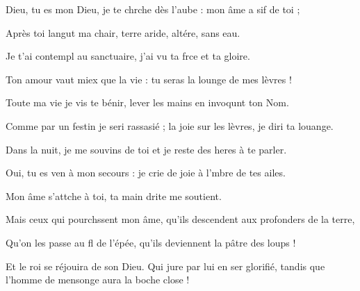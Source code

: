 \item Dieu, tu es mon Dieu, je te chrche dès l’aube :\psstar{} mon âme a sif de toi ;
\item Après toi langut ma chair,\psstar{} terre aride, altére, sans eau.
\item Je t’ai contempl au sanctuaire,\psstar{} j’ai vu ta frce et ta gloire.
\item Ton amour vaut miex que la vie :\psstar{} tu seras la lounge de mes lèvres !
\item Toute ma vie je vis te bénir,\psstar{} lever les mains en invoqunt ton Nom.
\item Comme par un festin je seri rassasié ;\psstar{} la joie sur les lèvres, je diri ta louange.
\item Dans la nuit, je me souvins de toi\psstar{} et je reste des heres à te parler.
\item Oui, tu es ven à mon secours :\psstar{} je crie de joie à l’mbre de tes ailes.
\item Mon âme s’attche à toi,\psstar{} ta main drite me soutient.
\item Mais ceux qui pourchssent mon âme,\psstar{} qu’ils descendent aux profonders de la terre,
\item Qu’on les passe au fl de l’épée,\psstar{} qu’ils deviennent la pâtre des loups !
\item Et le roi se réjouira de son Dieu.\pscross{} Qui jure par lui en ser glorifié,\psstar{} tandis que l’homme de mensonge aura la boche close !
